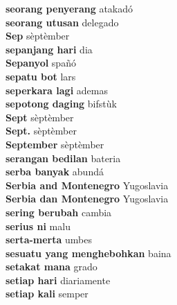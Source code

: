 \textbf{ seorang penyerang  } atakadó \\
\textbf{ seorang utusan  } delegado \\
\textbf{ Sep  } sèptèmber \\
\textbf{ sepanjang hari  } dia \\
\textbf{ Sepanyol  } spañó \\
\textbf{ sepatu bot  } lars \\
\textbf{ seperkara lagi  } ademas \\
\textbf{ sepotong daging  } bifstùk \\
\textbf{ Sept  } sèptèmber \\
\textbf{ Sept.  } sèptèmber \\
\textbf{ September  } sèptèmber \\
\textbf{ serangan bedilan  } bateria \\
\textbf{ serba banyak  } abundá \\
\textbf{ Serbia and Montenegro  } Yugoslavia \\
\textbf{ Serbia dan Montenegro  } Yugoslavia \\
\textbf{ sering berubah  } cambia \\
\textbf{ serius ni  } malu \\
\textbf{ serta-merta  } umbes \\
\textbf{ sesuatu yang menghebohkan  } baina \\
\textbf{ setakat mana  } grado \\
\textbf{ setiap hari  } diariamente \\
\textbf{ setiap kali  } semper \\
